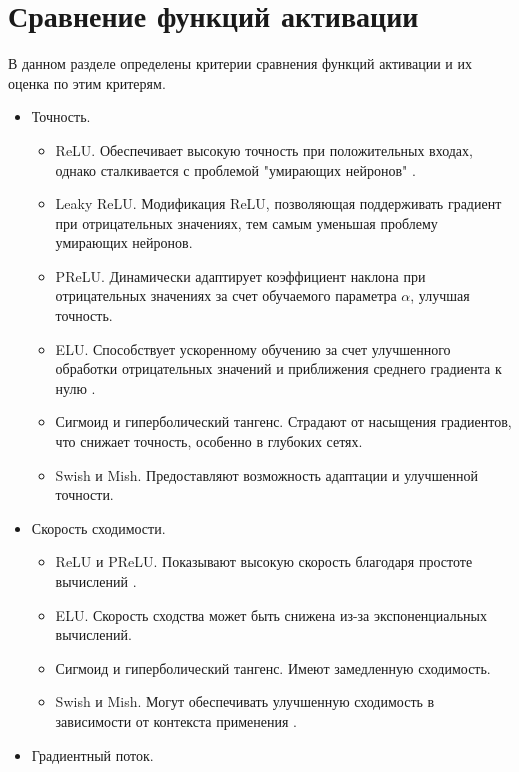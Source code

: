 
\chapter{Сравнение функций активации}

В данном разделе определены критерии сравнения функций активации и их оценка по этим критерям.

\begin{itemize}[label=---]
	\item Точность.
		\begin{itemize}
			\item ReLU. Обеспечивает высокую точность при положительных входах, однако сталкивается с проблемой "умирающих нейронов" \cite{mitcnnchapter}.
			\item Leaky ReLU. Модификация ReLU, позволяющая поддерживать градиент при отрицательных значениях, тем самым уменьшая проблему умирающих нейронов.
			\item PReLU. Динамически адаптирует коэффициент наклона при отрицательных значениях за счет обучаемого параметра $\alpha$, улучшая точность.
			\item ELU. Способствует ускоренному обучению за счет улучшенного обработки отрицательных значений и приближения среднего градиента к нулю \cite{fullycnnstruct}.
			\item Сигмоид и гиперболический тангенс. Страдают от насыщения градиентов, что снижает точность, особенно в глубоких сетях.
			\item Swish и Mish. Предоставляют возможность адаптации и улучшенной точности.
		\end{itemize}
	\item Скорость сходимости.
		\begin{itemize}
			\item ReLU и PReLU. Показывают высокую скорость благодаря простоте вычислений \cite{mitcnnchapter}.
			\item ELU. Скорость сходства может быть снижена из-за экспоненциальных вычислений.
			\item Сигмоид и гиперболический тангенс. Имеют замедленную сходимость.
			\item Swish и Mish. Могут обеспечивать улучшенную сходимость в зависимости от контекста применения \cite{survey}.
		\end{itemize}
	\item Градиентный поток.
		\begin{itemize}

\end{itemize}
\end{itemize}
